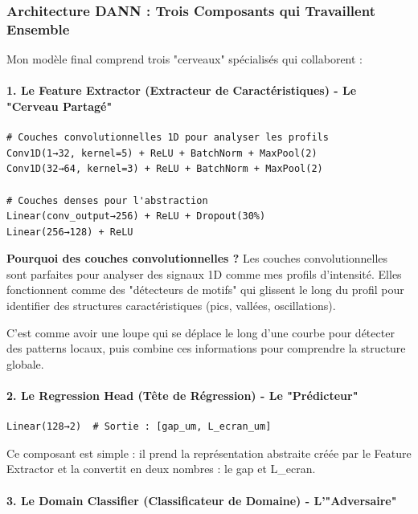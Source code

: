 \documentclass[11pt,a4paper]{article}
\begin{document}
\subsubsection{Architecture DANN : Trois Composants qui Travaillent Ensemble}

Mon modèle final comprend trois "cerveaux" spécialisés qui collaborent :

\paragraph{1. Le Feature Extractor (Extracteur de Caractéristiques) - Le "Cerveau Partagé"}

\begin{lstlisting}[caption=Architecture du Feature Extractor]
# Couches convolutionnelles 1D pour analyser les profils
Conv1D(1→32, kernel=5) + ReLU + BatchNorm + MaxPool(2)
Conv1D(32→64, kernel=3) + ReLU + BatchNorm + MaxPool(2)

# Couches denses pour l'abstraction
Linear(conv_output→256) + ReLU + Dropout(30%)
Linear(256→128) + ReLU
\end{lstlisting}

\begin{definitionbox}
\textbf{Pourquoi des couches convolutionnelles ?} Les couches convolutionnelles sont parfaites pour analyser des signaux 1D comme mes profils d'intensité. Elles fonctionnent comme des "détecteurs de motifs" qui glissent le long du profil pour identifier des structures caractéristiques (pics, vallées, oscillations).

C'est comme avoir une loupe qui se déplace le long d'une courbe pour détecter des patterns locaux, puis combine ces informations pour comprendre la structure globale.
\end{definitionbox}

\paragraph{2. Le Regression Head (Tête de Régression) - Le "Prédicteur"}

\begin{lstlisting}[caption=Prédicteur de paramètres physiques]
Linear(128→2)  # Sortie : [gap_um, L_ecran_um]
\end{lstlisting}

Ce composant est simple : il prend la représentation abstraite créée par le Feature Extractor et la convertit en deux nombres : le gap et L\_ecran.

\paragraph{3. Le Domain Classifier (Classificateur de Domaine) - L'"Adversaire"}
\end{document}
